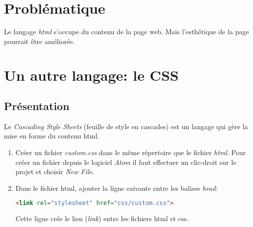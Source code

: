 \documentclass[a4paper,11pt]{article}
\begin{document}
\begin{Form}
\section{Problématique}
Le langage \emph{html} s'occupe du contenu de la page web. Mais l'esthétique de la page pourrait être améliorée.
\begin{center}
\end{center}
\section{Un autre langage: le CSS}
\subsection{Présentation}
Le \emph{Cascading Style Sheets} (feuille de style en cascades) est un langage qui gère la mise en forme du contenu html.
\begin{activite}
\begin{enumerate}
\item Créer un fichier \emph{custom.css} dans le même répertoire que le fichier \emph{html}. Pour créer un fichier depuis le logiciel \emph{Atom} il faut effectuer un clic-droit sur le projet et choisir \emph{New File}.
\item Dans le fichier html, ajouter la ligne suivante entre les balises \emph{head}:
\begin{lstlisting}[language=html]
<link rel="stylesheet" href="css/custom.css">
\end{lstlisting}
Cette ligne crée le lien (\emph{link}) entre les fichiers html et css.
\end{enumerate}
\end{activite}

\end{Form}
\end{document}

